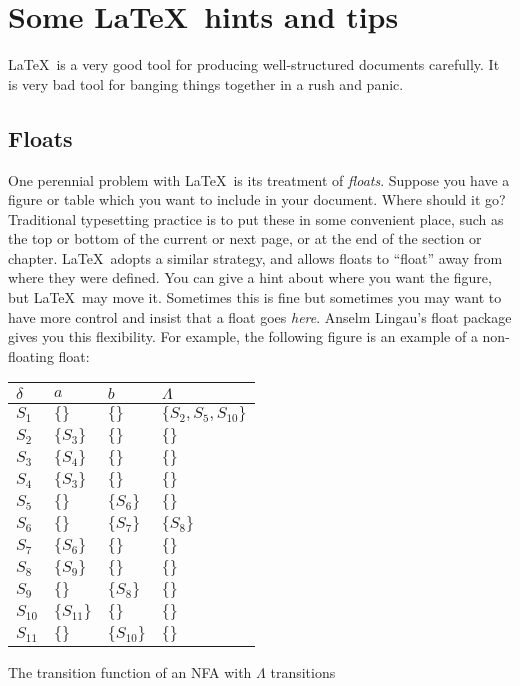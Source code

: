 \chapter{Some \LaTeX\ hints and tips}\label{C:ex}
\LaTeX\ is a very good tool for producing well-structured documents
carefully. It is very bad tool for banging things together in a rush
and panic.

\section{Floats}
One perennial problem with \LaTeX\ is its treatment of
\emph{floats}.  Suppose you have a figure or table which you want to
include in your document. Where should it go? Traditional typesetting
practice is to put these in some convenient place, such as the top or
bottom of the current or next page, or at the end of the section or
chapter.  \LaTeX\ adopts a similar strategy, and allows floats to
``float'' away from where they were defined. You can give a hint
about where you want the figure, but \LaTeX\ may move it. Sometimes
this is fine but sometimes you may want to have more control and
insist that a float goes \emph{here}. Anselm Lingau's
\textsf{float} package gives you this flexibility. For example, the following figure is an example of a non-floating float:

\begin{fig}[H]
\begin{center}
\begin{tabular}{l|lll}
$\delta$ & $\mathit{a}$ & $\mathit{b}$ & $\Lambda$ \\ \hline
$S_{1}$  & $\{\}$       & $\{\}$      & $\{S_{2}, S_{5}, S_{10}\}$\\
$S_{2}$  & $\{S_{3}\}$  & $\{\}$      & $\{\}$\\
$S_{3}$  & $\{S_{4}\}$  & $\{\}$      & $\{\}$\\
$S_{4}$  & $\{S_{3}\}$  & $\{\}$      & $\{\}$\\
$S_{5}$  & $\{\}$       & $\{S_{6}\}$ & $\{\}$\\
$S_{6}$  & $\{\}$       & $\{S_{7}\}$ & $\{S_{8}\}$\\
$S_{7}$  & $\{S_{6}\}$  & $\{\}$      & $\{\}$\\
$S_{8}$  & $\{S_{9}\}$  & $\{\}$      & $\{\}$\\
$S_{9}$  & $\{\}$       & $\{S_{8}\}$ & $\{\}$\\
$S_{10}$ & $\{S_{11}\}$ & $\{\}$      & $\{\}$\\
$S_{11}$ & $\{\}$       & $\{S_{10}\}$& $\{\}$\\
\end{tabular}
\caption{The transition function of an NFA with $\Lambda$  transitions}

\end{center}
\end{fig}

